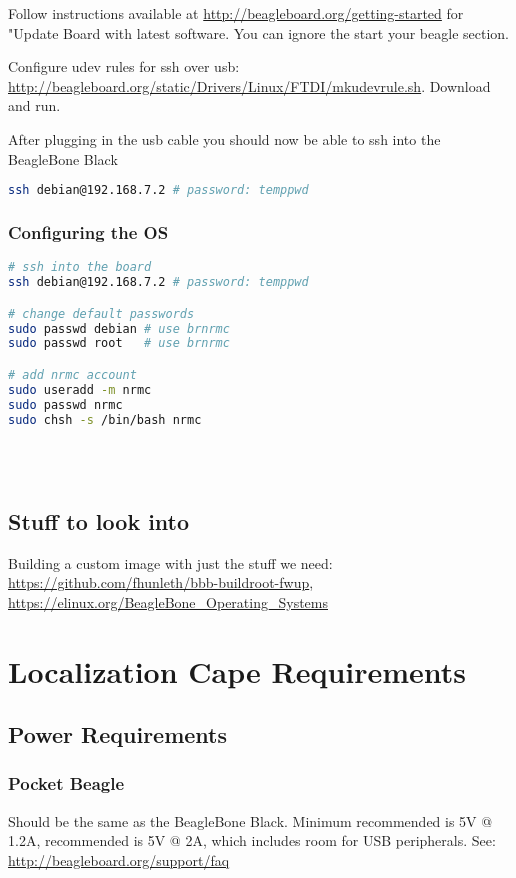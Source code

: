 \documentclass[]{book}
\begin{document}
Follow instructions available at \url{http://beagleboard.org/getting-started} for "Update Board with latest software. You can ignore the start your beagle section.

Configure udev rules for ssh over usb: \url{http://beagleboard.org/static/Drivers/Linux/FTDI/mkudevrule.sh}. Download and run.

After plugging in the usb cable you should now be able to ssh into the BeagleBone Black

\begin{lstlisting}[language=bash]
ssh debian@192.168.7.2 # password: temppwd
\end{lstlisting}

\pagebreak
\subsection{Configuring the OS}
\begin{lstlisting}[language=bash]
# ssh into the board
ssh debian@192.168.7.2 # password: temppwd

# change default passwords
sudo passwd debian # use brnrmc
sudo passwd root   # use brnrmc

# add nrmc account
sudo useradd -m nrmc
sudo passwd nrmc
sudo chsh -s /bin/bash nrmc





\end{lstlisting}



\section{Stuff to look into}
Building a custom image with just the stuff we need: \url{https://github.com/fhunleth/bbb-buildroot-fwup}, \url{https://elinux.org/BeagleBone_Operating_Systems}

\chapter{Localization Cape Requirements}
\section{Power Requirements}
\subsection{Pocket Beagle}
Should be the same as the BeagleBone Black. Minimum recommended is 5V @ 1.2A, recommended is 5V @ 2A, which includes room for USB peripherals. See: \url{http://beagleboard.org/support/faq}
\end{document}
